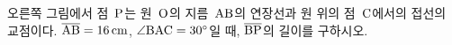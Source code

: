 \noindent\begin{minipage}[t]{0.58\linewidth}\vspace{0pt}\raggedright 오른쪽 그림에서 점~$\mathrm{P}$는 원~$\mathrm{O}$의 지름~$\mathrm{AB}$의 연장선과 원 위의 점~$\mathrm{C}$에서의 접선의 교점이다. $\overline{\mathrm{AB}}=16\,\mathrm{cm}$, $\angle\mathrm{BAC}=30^\circ$일 때, $\overline{\mathrm{BP}}$의 길이를 구하시오.\end{minipage}\hfill\begin{minipage}[t]{0.4\linewidth}\vspace{0pt}\centering \resizebox{\ifdim\width>\linewidth\linewidth\else\width\fi}{!}{}\end{minipage}\par
